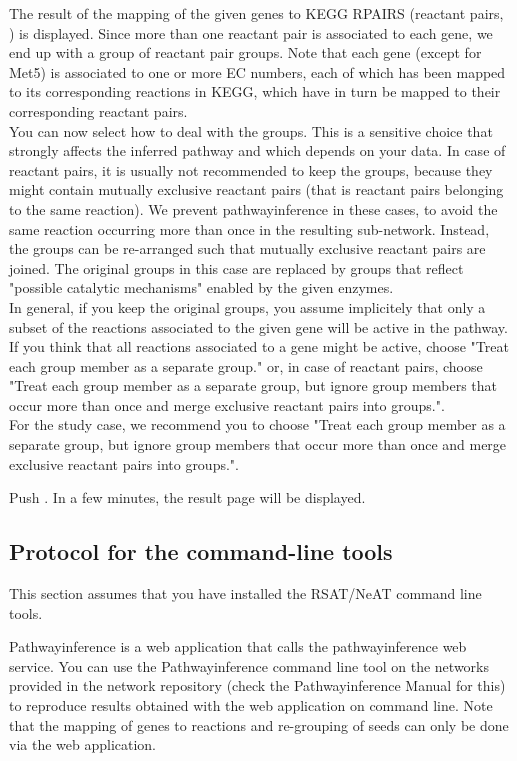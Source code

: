 The result of the mapping of the given genes to KEGG RPAIRS (reactant pairs, \cite{Kotera2004}) is displayed.
Since more than one reactant pair is associated to each gene, we end up with a group of reactant pair groups.
Note that each gene (except for Met5) is associated to one or more EC numbers, each of which has been mapped
to its corresponding reactions in KEGG, which have in turn be mapped to their corresponding reactant pairs.\\

You can now select how to deal with the groups. This is a sensitive choice that strongly
affects the inferred pathway and which depends on your data.
In case of reactant pairs, it is usually not recommended to keep the groups, because
they might contain mutually exclusive reactant pairs (that is reactant pairs belonging to the same reaction).
We prevent pathwayinference in these cases, to avoid the same reaction occurring more than once in the resulting sub-network.
Instead, the groups can be re-arranged such that mutually exclusive reactant pairs are joined.
The original groups in this case are replaced by groups that reflect
"possible catalytic mechanisms" enabled by the given enzymes.\\
In general, if you keep the original groups, you assume implicitely that only
a subset of the reactions associated to the given gene will be active in the pathway.
If you think that all reactions associated to a gene might be active, choose "Treat each group member as a separate group." or,
in case of reactant pairs, choose "Treat each group member as a separate group, but ignore group members that occur more than once and merge exclusive reactant pairs into groups.".\\

For the study case, we recommend you to choose "Treat each group member as a separate group, but ignore group members that occur more than once and merge exclusive reactant pairs into groups.".

Push . In a few minutes, the result page will be displayed.



\subsection{Protocol for the command-line tools}

This section assumes that you have installed the RSAT/NeAT command line tools.

Pathwayinference is a web application that calls the pathwayinference web service.
You can use the Pathwayinference command line tool on the networks provided in the
network repository (check the Pathwayinference Manual for this) to reproduce
results obtained with the web application on command line. Note that the mapping of genes to reactions
and re-grouping of seeds can only be done via the web application.

